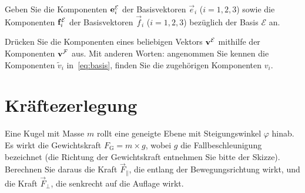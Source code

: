 \documentclass{scrartcl}
\newcommand{\ee}{\vec{e}}
\newcommand{\ff}{\vec{f}}
\begin{document}
\begin{subex}
  \item{} Geben Sie die Komponenten $\mathbf{e}_i^\mathcal{E}$ der Basisvektoren $\ee_i$ ($i=1,2,3$) sowie die Komponenten $\mathbf{f}_i^\mathcal{E}$ der Basisvektoren $\ff_i$ ($i=1,2,3$) bezüglich der Basis $\mathcal{E}$ an.
  \item{} Drücken Sie die Komponenten eines beliebigen Vektors $\mathbf{v}^\mathcal{E}$ mithilfe der Komponenten $\mathbf{v}^\mathcal{F}$ aus.
  Mit anderen Worten: angenommen Sie kennen die Komponenten $\tilde{v}_i$ in~\eqref{eq:basis}, finden Sie die zugehörigen Komponenten $v_i$. 
\end{subex}

\section{Kräftezerlegung }
Eine Kugel mit Masse $m$ rollt eine geneigte Ebene mit Steigungswinkel $\varphi$ hinab.
Es wirkt die Gewichtskraft $F_\mathrm{G} = m \times g$, wobei $g$ die Fallbeschleunigung bezeichnet (die Richtung der Gewichtskraft entnehmen Sie bitte der Skizze).
Berechnen Sie daraus die Kraft $\vec{F}_\parallel$, die entlang der Bewegungsrichtung wirkt, und die Kraft $\vec{F}_\perp$, die senkrecht auf die Auflage wirkt.


\begin{center}
\end{center}
\end{document}
